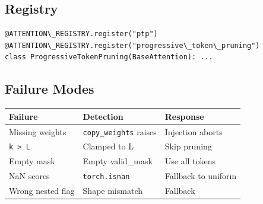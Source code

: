 \subsection{Registry}

\begin{lstlisting}
@ATTENTION\_REGISTRY.register("ptp")
@ATTENTION\_REGISTRY.register("progressive\_token\_pruning")
class ProgressiveTokenPruning(BaseAttention): ...
\end{lstlisting}

\subsection{Failure Modes}

\begin{table}[H]
\centering
\small
\begin{tabular}{lll}
\toprule
\textbf{Failure} & \textbf{Detection} & \textbf{Response} \\
\midrule
Missing weights & \texttt{copy\_weights} raises & Injection aborts \\
\texttt{k \textgreater{} L} & Clamped to L & Skip pruning \\
Empty mask & Empty valid\_mask & Use all tokens \\
NaN scores & \texttt{torch.isnan} & Fallback to uniform \\
Wrong nested flag & Shape mismatch & Fallback \\
\bottomrule
\end{tabular}
\end{table}

